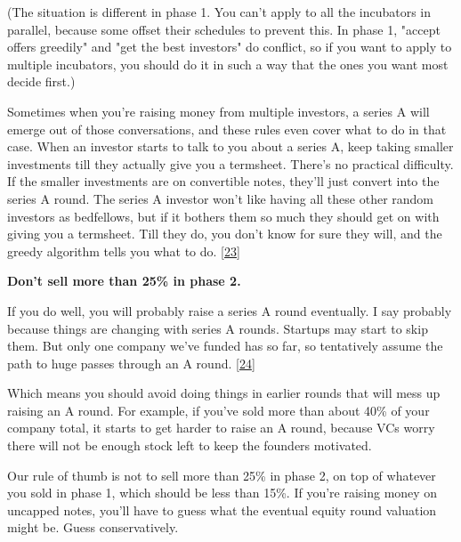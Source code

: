 (The situation is different in phase
                    1. You can't apply to all the incubators in parallel,
                    because some offset their schedules to prevent this. In
                    phase 1, "accept offers greedily" and "get the best
                    investors" do conflict, so if you want to apply to multiple
                    incubators, you should do it in such a way that the ones you
                    want most decide first.)

Sometimes when you're
                    raising money from multiple investors, a series A will
                    emerge out of those conversations, and these rules even
                    cover what to do in that case. When an investor starts to
                    talk to you about a series A, keep taking smaller
                    investments till they actually give you a termsheet. There's
                    no practical difficulty. If the smaller investments are on
                    convertible notes, they'll just convert into the series A
                    round. The series A investor won't like having all these
                    other random investors as bedfellows, but if it bothers them
                    so much they should get on with giving you a termsheet. Till
                    they do, you don't know for sure they will, and the greedy
                    algorithm tells you what to do.
                    [\href{\#f23n}{23}]


                    \textbf{Don't sell more than 25\% in phase 2.}

If
                    you do well, you will probably raise a series A round
                    eventually. I say probably because things are changing with
                    series A rounds. Startups may start to skip them. But only
                    one company we've funded has so far, so tentatively assume
                    the path to huge passes through an A round.
                    [\href{\#f24n}{24}]

Which means you should avoid doing things in
                    earlier rounds that will mess up raising an A round. For
                    example, if you've sold more than about 40\% of your company
                    total, it starts to get harder to raise an A round, because
                    VCs worry there will not be enough stock left to keep the
                    founders motivated.

Our rule of thumb is not to
                    sell more than 25\% in phase 2, on top of whatever you sold
                    in phase 1, which should be less than 15\%. If you're raising
                    money on uncapped notes, you'll have to guess what the
                    eventual equity round valuation might be. Guess
                    conservatively.


